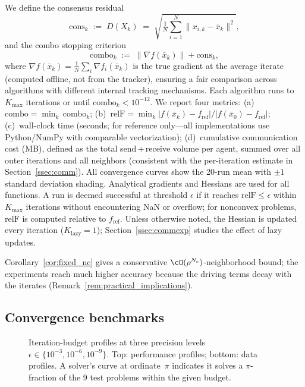 \documentclass[review,onefignum,onetabnum]{siamart171218}
\begin{document}
	We define the consensus residual
	\[
	  \mathrm{cons}_k
	  \;:=\;
	  D(X_k)
	  \;=\;
	  \sqrt{\tfrac{1}{N}\textstyle\sum_{i=1}^{N}\|x_{i,k}-\bar x_k\|^{2}},
	\]
	and the combo stopping criterion
	\[
	  \mathrm{combo}_k
	  \;:=\;
	  \|\nabla f(\bar x_k)\| + \mathrm{cons}_k,
	\]
	where $\nabla f(\bar x_k)=\frac{1}{N}\sum_{i}\nabla f_i(\bar x_k)$
	is the true gradient at the average iterate (computed offline,
	not from the tracker), ensuring a fair comparison across algorithms
	with different internal tracking mechanisms.
	Each algorithm runs to $K_{\max}$ iterations or until
	$\mathrm{combo}_k < 10^{-12}$.
	We report four metrics:
	(a)~$\mathrm{combo}=\min_k\,\mathrm{combo}_k$;
	(b)~$\mathrm{relF}=\min_k |f(\bar x_k)-f_{\mathrm{ref}}|/|f(\bar x_0)-f_{\mathrm{ref}}|$;
	(c)~wall-clock time (seconds; for reference only---all implementations
	use Python/NumPy with comparable vectorization);
	(d)~cumulative communication cost (MB), defined as the total
	send\,+\,receive volume per agent, summed over all outer iterations and all
	neighbors (consistent with the per-iteration estimate in Section~\ref{ssec:comm}).
	All convergence curves show the 20-run mean with $\pm1$ standard
	deviation shading.
	Analytical gradients and Hessians are used for all functions.
	A run is deemed successful at threshold $\epsilon$ if it reaches
	$\mathrm{relF}\le\epsilon$ within $K_{\max}$ iterations without
	encountering NaN or overflow; for nonconvex problems, $\mathrm{relF}$ is
	computed relative to $f_{\mathrm{ref}}$.
	Unless otherwise noted, the Hessian is updated every iteration
	($K_{\mathrm{lazy}}{=}1$); Section~\ref{ssec:commexp} studies the
	effect of lazy updates.
	
	Corollary~\ref{cor:fixed_nc} gives a conservative
	$\cO(\rho^{N_c})$-neighborhood bound; the experiments reach
	much higher accuracy because the driving terms decay with the
	iterates (Remark~\ref{rem:practical_implications}).
	
	\FloatBarrier
	\subsection{Convergence benchmarks}\label{ssec:convergence}
	
	
	\begin{figure}[htbp]
		\centering
		\caption{Iteration-budget profiles at three precision levels
			$\epsilon\in\{10^{-3},10^{-6},10^{-9}\}$.
			Top: performance profiles; bottom: data profiles.
			A solver's curve at ordinate~$\pi$ indicates it solves a
			$\pi$-fraction of the 9 test problems within the given budget.}
		\label{fig:profiles}
	\end{figure}
	
\end{document}
